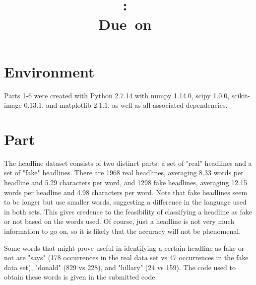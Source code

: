 \documentclass{article}
\title{
	\vspace{2in}
	\textmd{\textbf{\hmwkClass:\ \hmwkTitle}}\\
	\normalsize\vspace{0.1in}\small{Due\ on\ \hmwkDueDate}\\
	\vspace{0.1in}
	\vspace{3in}
}
\author{\textbf{\hmwkAuthorName}}
\newcommand{\enterproblemHeader}[1]{
}
\newcommand{\exitproblemHeader}[1]{
}
\newcounter{problem} %
\newcommand{\problemName}{}
\newenvironment{problem}[1][Part \theproblem]{ %
	\stepcounter{problem} %
	\renewcommand{\problemName}{#1} %
	\section{\problemName} %
	\enterproblemHeader{\problemName} %
}{
	\exitproblemHeader{\problemName} %
}
\begin{document}
\maketitle
\clearpage


\begin{problem}[Environment]	
	Parts 1-6 were created with Python 2.7.14 with numpy 1.14.0, scipy 1.0.0, scikit-image 0.13.1, and matplotlib 2.1.1, as well as all associated dependencies. 
\end{problem}
\clearpage

\FloatBarrier
\begin{problem}
	
	The headline dataset consists of two distinct parts: a set of "real" headlines and a set of "fake" headlines. There are 1968 real headlines, averaging 8.33 words per headline and 5.29 characters per word, and 1298 fake headlines, averaging 12.15 words per headline and 4.98 characters per word. Note that fake headlines seem to be longer but use smaller words, suggesting a difference in the language used in both sets. This gives credence to the feasibility of classifying a headline as fake or not based on the words used. Of course, just a headline is not very much information to go on, so it is likely that the accuracy will not be phenomenal.
	
	Some words that might prove useful in identifying a certain headline as fake or not are "says" (178 occurrences in the real data set vs 47 occurrences in the fake data set), "donald" (829 vs 228), and "hillary" (24 vs 159). The code used to obtain these words is given in the submitted code.
	
\end{problem}
\clearpage

\end{document}
